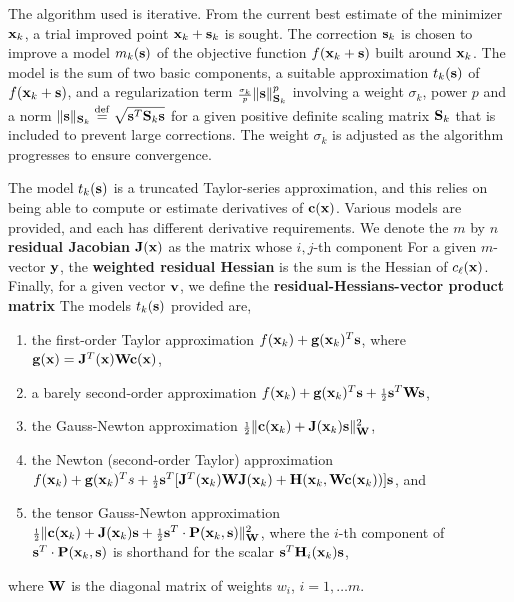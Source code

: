 \documentclass{galahad}
\begin{document}

\galterminology
The algorithm used is iterative. From the current best estimate
of the minimizer ${\mathbf{x}}_k$, a trial improved point ${\mathbf{x}}_k + {\mathbf{s}}_k$ is sought.
The correction ${\mathbf{s}}_k$ is chosen to improve a model $m_k({\mathbf{s}})$ of
the objective function $f({\mathbf{x}}_k+{\mathbf{s}})$ built around
${\mathbf{x}}_k$. The model is the sum of two basic components,
a suitable approximation $t_k({\mathbf{s}})$ of $f({\mathbf{x}}_k+{\mathbf{s}})$,
and a regularization term ${\scriptstyle \frac{\sigma_k}{p}} \|{\mathbf{s}}\|_{{\mathbf{S}}_k}^p$
involving a weight $\sigma_k$, power $p$ and
a norm $\|{\mathbf{s}}\|_{{\mathbf{S}}_k} \stackrel{\rm def}{=} \sqrt{{\mathbf{s}}^T {\mathbf{S}}_k {\mathbf{s}}}$ for a given positive
definite scaling matrix ${\mathbf{S}}_k$ that is included to prevent large corrections.
The weight  $\sigma_k$ is adjusted as the algorithm progresses to
ensure convergence.

The model $t_k({\mathbf{s}})$ is a truncated Taylor-series approximation, and this
relies on being able to compute or estimate derivatives of ${\mathbf{c}}({\mathbf{x}})$.
Various models are provided, and each has different derivative requirements.
We denote the $m$ by $n$ {\bf residual Jacobian} ${\mathbf{J}}({\mathbf{x}})$ as the matrix
whose $i,j$-th component
For a given $m$-vector ${\mathbf{y}}$, the
{\bf weighted residual Hessian} is the sum
is the Hessian of $c_\ell({\mathbf{x}})$.
Finally, for a given vector ${\mathbf{v}}$, we define
the {\bf residual-Hessians-vector product matrix}
The models $t_k({\mathbf{s}})$ provided are,
\begin{enumerate}
\item the first-order Taylor approximation $f({\mathbf{x}}_k) + {\mathbf{g}}({\mathbf{x}}_k)^T {\mathbf{s}}$,
where
${\mathbf{g}}({\mathbf{x}}) = {\mathbf{J}}^T({\mathbf{x}}) {\mathbf{W}} {\mathbf{c}}({\mathbf{x}})$,
\item a barely second-order approximation
$f({\mathbf{x}}_k) + {\mathbf{g}}({\mathbf{x}}_k)^T {\mathbf{s}} + {\scriptstyle \frac{1}{2}} {\mathbf{s}}^T {\mathbf{W}} {\mathbf{s}}$,
\item the Gauss-Newton approximation
${\scriptstyle \frac{1}{2}} \| {\mathbf{c}}({\mathbf{x}}_k) + {\mathbf{J}}({\mathbf{x}}_k) {\mathbf{s}}\|_{{\mathbf{W}}}^2$,
\item the Newton (second-order Taylor) approximation
  $f({\mathbf{x}}_k) + {\mathbf{g}}({\mathbf{x}}_k)^T s + {\scriptstyle \frac{1}{2}} {\mathbf{s}}^T
  [ {\mathbf{J}}^T({\mathbf{x}}_k) {\mathbf{W}} {\mathbf{J}}({\mathbf{x}}_k) +
{\mathbf{H}}({\mathbf{x}}_k,{\mathbf{W}} {\mathbf{c}}({\mathbf{x}}_k))] {\mathbf{s}}$, and
\item the tensor Gauss-Newton approximation
${\scriptstyle \frac{1}{2}} \| {\mathbf{c}}({\mathbf{x}}_k) + {\mathbf{J}}({\mathbf{x}}_k) {\mathbf{s}} +
 {\scriptstyle \frac{1}{2}} {\mathbf{s}}^T \cdot {\mathbf{P}}({\mathbf{x}}_k,{\mathbf{s}}) \|_{{\mathbf{W}}}^2$,
where the $i$-th component of ${\mathbf{s}}^T \cdot {\mathbf{P}}({\mathbf{x}}_k,{\mathbf{s}})$ is
shorthand for the scalar ${\mathbf{s}}^T {\mathbf{H}}_i({\mathbf{x}}_k) {\mathbf{s}}$,
\end{enumerate}
where ${\mathbf{W}}$ is the diagonal matrix of weights $w_i$, $i = 1, \ldots m$.
\end{document}
